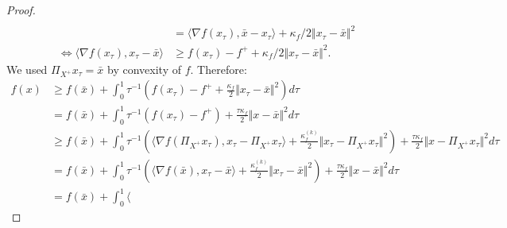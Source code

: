 \documentclass[12pt]{report}
\begin{document}
\begin{proof}
\begin{align*}
                    \\
                    &= 
                    \langle \nabla f(x_\tau), \bar x - x_\tau\rangle + 
                    \kappa_f/2 \Vert x_\tau - \bar x\Vert^2
                    \\
                    \iff 
                    \langle \nabla f(x_\tau), x_\tau - \bar x\rangle
                    &\ge f(x_\tau) - f^+ + \kappa_f/2\Vert x_\tau -\bar x\Vert^2. 
                \end{align*}
                We used $\Pi_{X^+}x_\tau = \bar x$ by convexity of $f$. 
                Therefore:
                {\footnotesize
                \begin{align*}
                    f(x) &\ge 
                    f(\bar x) + 
                    \int_0^1 \tau^{-1} \left(
                        f(x_\tau) - f^+ + \frac{\kappa_f}{2}\Vert x_\tau - \bar x\Vert^2
                    \right) d\tau
                    \\
                    &= 
                    f(\bar x) + 
                    \int_0^1 
                    \tau^{-1} \left(
                            f(x_\tau) - f^+ 
                        \right)
                        + \frac{\tau\kappa_f}{2}\Vert x - \bar x\Vert^2
                    d\tau
                    \\
                    &\ge 
                    f(\bar x) + 
                    \int_0^1 
                    \tau^{-1} \left(
                            \langle 
                                \nabla f(\Pi_{X^+}x_\tau), x_\tau - \Pi_{X^+}x_\tau
                            \rangle
                            + \frac{\kappa_f^{(k)}}{2} \Vert x_\tau - \Pi_{X^+}x_\tau\Vert^2
                        \right)
                        + \frac{\tau\kappa_f}{2}\Vert x - \Pi_{X^+}x_\tau\Vert^2
                    d\tau
                    \\
                    &= 
                    f(\bar x) + 
                    \int_0^1 
                    \tau^{-1} \left(
                            \langle 
                                \nabla f(\bar x), x_\tau - \bar x
                            \rangle
                            + \frac{\kappa_f^{(k)}}{2} \Vert x_\tau - \bar x\Vert^2
                        \right)
                        + \frac{\tau\kappa_f}{2}\Vert x - \bar x\Vert^2
                    d\tau
                    \\
                    &= 
                    f(\bar x) + 
                    \int_0^1 
                        \langle 

\end{align*}}
\end{proof}
\end{document}
